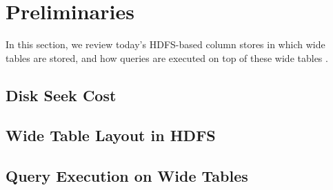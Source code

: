 \section{Preliminaries}

In this section, we review today's HDFS-based column stores in which wide tables are stored, and how queries are executed on top of these wide tables \cite{IEEEexample:IEEEwebsite}.

\subsection{Disk Seek Cost}

\subsection{Wide Table Layout in HDFS}


\subsection{Query Execution on Wide Tables}


